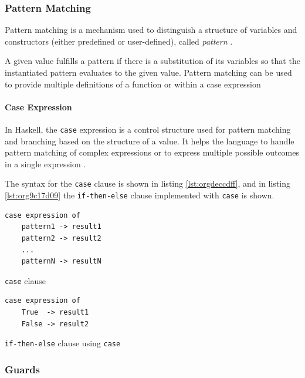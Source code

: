 \documentclass[a4paper, titlepage, twoside]{article}
\begin{document}
\subsubsection{Pattern Matching}
\label{sec:org2f60cd1}

Pattern matching is a mechanism used to distinguish a structure of variables and constructors (either predefined or user-defined), called \emph{pattern} \autocite[chapter 3.17]{marlowHaskell2010Language2010}.

A given value fulfills a pattern if there is a substitution of its variables so that the instantiated pattern evaluates to the given value. Pattern matching can be used to provide multiple definitions of a function or within a case expression

\paragraph*{Case Expression}
\label{sec:org06757c3}

In Haskell, the \texttt{case} expression is a control structure used for pattern matching and branching based on the structure of a value. It helps the language to handle pattern matching of complex expressions or to express multiple possible outcomes in a single expression \autocite{kremerCPSC449Programming2015}.

The syntax for the \texttt{case} clause is shown in listing \ref{lst:orgdeccdff}, and in listing \ref{lst:org9c17d09} the \texttt{if-then-else} clause implemented with \texttt{case} is shown.

\begin{listing}[htbp]
\begin{verbatim}
case expression of
    pattern1 -> result1
    pattern2 -> result2
    ...
    patternN -> resultN
\end{verbatim}
\caption{\label{lst:orgdeccdff}\texttt{case} clause}
\end{listing}

\begin{listing}[htbp]
\begin{verbatim}
case expression of
    True  -> result1
    False -> result2
\end{verbatim}
\caption{\label{lst:org9c17d09}\texttt{if-then-else} clause using \texttt{case}}
\end{listing}

\subsubsection{Guards}
\label{sec:orgc3338a9}
\end{document}
